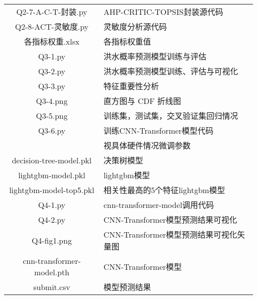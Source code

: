\documentclass[withoutpreface,bwprint]{cumcmthesis} %
\begin{document}
\begin{longtable}[htbp]{cl}
		Q2-7-A-C-T-封装.py & AHP-CRITIC-TOPSIS封装源代码 \\
		Q2-8-ACT-灵敏度.py & 灵敏度分析源代码 \\
		各指标权重.xlsx & 各指标权重值 \\
		Q3-1.py & 洪水概率预测模型训练与评估 \\
		Q3-2.py & 洪水概率预测模型训练、评估与可视化 \\
		Q3-3.py & 特征重要性分析 \\
		Q3-4.png & 直方图与 CDF 折线图 \\
		Q3-5.png & 训练集，测试集，交叉验证集回归情况 \\
		Q3-6.py & 训练CNN-Transformer模型代码\\& 视具体硬件情况微调参数 \\
		decision-tree-model.pkl & 决策树模型 \\
		lightgbm-model.pkl & lightgbm模型 \\
		lightgbm-model-top5.pkl & 相关性最高的5个特征lightgbm模型 \\
		Q4-1.py & cnn-transformer-model调用代码 \\
		Q4-2.py & CNN-Transformer模型预测结果可视化 \\
		Q4-fig1.png & CNN-Transformer模型预测结果可视化矢量图 \\
		cnn-transformer-model.pth & CNN-Transformer模型 \\
		submit.csv & 模型预测结果 \\
		\hline
\end{longtable}

\newpage
\end{document}
